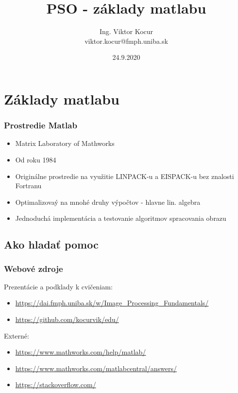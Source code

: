 \documentclass{beamer}
\title[1. cvičenie]{PSO - základy matlabu}
\author[Kocur]{Ing. Viktor Kocur \\{\small viktor.kocur@fmph.uniba.sk}}
\institute{DAI FMFI UK}
\date{24.9.2020}
\begin{document}


\begin{frame}

  \titlepage

\end{frame}

\section{Základy matlabu}
\begin{frame}
\frametitle{Prostredie Matlab}

\begin{itemize}
\item Matrix Laboratory of Mathworks
\item Od roku 1984
\item Originálne prostredie na využitie LINPACK-u a EISPACK-u bez znalosti Fortranu
\item Optimalizovaý na mnohé druhy výpočtov - hlavne lin. algebra
\item Jednoduchá implementácia a testovanie algoritmov spracovania obrazu
\end{itemize}
\end{frame}

\subsection{Ako hladať pomoc}

\begin{frame}
\frametitle{Webové zdroje}

Prezentácie a podklady k cvičeniam:
\begin{itemize}
\item \url{https://dai.fmph.uniba.sk/w/Image_Processing_Fundamentals/}
\item \url{https://github.com/kocurvik/edu/}
\end{itemize}


Externé:
\begin{itemize}
\item \url{https://www.mathworks.com/help/matlab/}
\item \url{https://www.mathworks.com/matlabcentral/answers/}
\item \url{https://stackoverflow.com/}
\end{itemize}
\end{frame}
\end{document}
